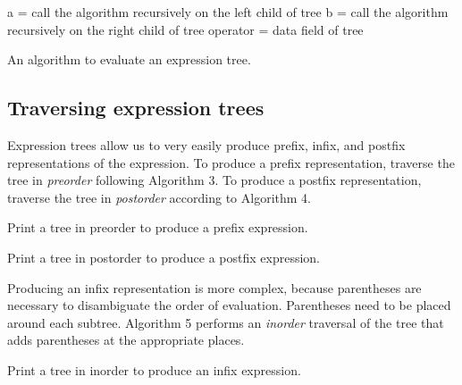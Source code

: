 \documentclass[10pt, a4paper, twosize]{article}
\begin{document}
\begin{algorithm}[h]
{
{
}
{
a = call the algorithm recursively on the left child of tree\;
b = call the algorithm recursively on the right child of tree\;
operator = data field of tree\;
}
}
\caption{An algorithm to evaluate an expression tree.}
\end{algorithm}


\subsection{Traversing expression trees}
Expression trees allow us to very easily produce prefix, infix, and postfix representations of the expression. To produce a prefix representation, traverse the tree in \emph{preorder} following Algorithm 3. To produce a postfix representation, traverse the tree in \emph{postorder} according to Algorithm 4. 
\begin{algorithm}[h]
\caption{Print a tree in preorder to produce a prefix expression.}	
\end{algorithm}

\begin{algorithm}[h]
\caption{Print a tree in postorder to produce a postfix expression.}	
\end{algorithm}

Producing an infix representation is more complex, because parentheses are necessary to disambiguate the order of evaluation. Parentheses need to be placed around each subtree. Algorithm 5 performs an \emph{inorder} traversal of the tree that adds parentheses at the appropriate places. 

\begin{algorithm}[h]
\caption{Print a tree in inorder to produce an infix expression.}	
\end{algorithm}
\end{document}
